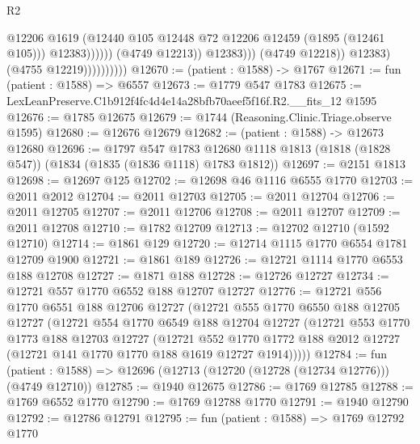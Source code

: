 \begin{lexlean}{R2}
\begin{coremodule}
                                              @12206
                                              @1619
                                              (@12440
                                                @105
                                                @12448
                                                @72
                                                @12206
                                                @12459
                                                (@1895 (@12461 @105)))
                                              @12383))))))
                                  (@4749 @12213))
                                @12383)))
                          (@4749 @12218))
                        @12383)
                      (@4755 @12219))))))))))
@12670 := (patient : @1588) -> @1767
@12671 := fun (patient : @1588) => @6557
@12673 := @1779 @547 @1783
@12675 := LexLeanPreserve.C1b912f4fc4d4e14a28bfb70aeef5f16f.R2.__fits_12 @1595
@12676 := @1785 @12675
@12679 := @1744 (Reasoning.Clinic.Triage.observe @1595)
@12680 := @12676 @12679
@12682 := (patient : @1588) -> @12673 @12680
@12696 := @1797
    @547
    @1783
    @12680
    @1118
    @1813
    (@1818 (@1828 @547))
    (@1834 (@1835 (@1836 @1118) @1783 @1812))
@12697 := @2151 @1813
@12698 := @12697 @125
@12702 := @12698 @46 @1116 @6555 @1770
@12703 := @2011 @2012
@12704 := @2011 @12703
@12705 := @2011 @12704
@12706 := @2011 @12705
@12707 := @2011 @12706
@12708 := @2011 @12707
@12709 := @2011 @12708
@12710 := @1782 @12709
@12713 := @12702 @12710 (@1592 @12710)
@12714 := @1861 @129
@12720 := @12714 @1115 @1770 @6554 @1781 @12709 @1900
@12721 := @1861 @189
@12726 := @12721 @1114 @1770 @6553 @188 @12708
@12727 := @1871 @188
@12728 := @12726 @12727
@12734 := @12721 @557 @1770 @6552 @188 @12707 @12727
@12776 := @12721
    @556
    @1770
    @6551
    @188
    @12706
    @12727
    (@12721
      @555
      @1770
      @6550
      @188
      @12705
      @12727
      (@12721
        @554
        @1770
        @6549
        @188
        @12704
        @12727
        (@12721
          @553
          @1770
          @1773
          @188
          @12703
          @12727
          (@12721
            @552
            @1770
            @1772
            @188
            @2012
            @12727
            (@12721 @141 @1770 @1770 @188 @1619 @12727 @1914)))))
@12784 := fun (patient : @1588) => @12696 (@12713 (@12720 (@12728 (@12734 @12776))) (@4749 @12710))
@12785 := @1940 @12675
@12786 := @1769 @12785
@12788 := @1769 @6552 @1770
@12790 := @1769 @12788 @1770
@12791 := @1940 @12790
@12792 := @12786 @12791
@12795 := fun (patient : @1588) => @1769 @12792 @1770

\end{coremodule}
\end{lexlean}
